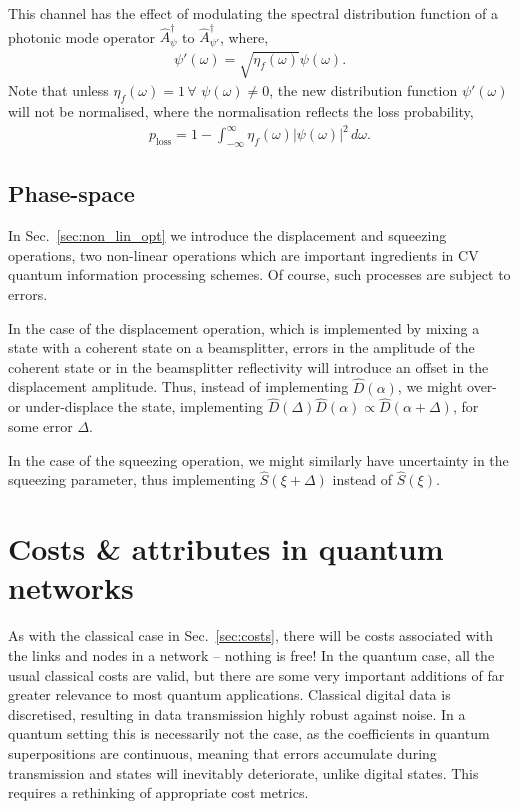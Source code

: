 \documentclass[aps, rmp, twocolumn, amsmath, amssymb, nofootinbib, superscriptaddress, longbibliography, floatfix, table-of-contents, eqsecnum]{revtex4-1}
\begin{document}
This channel has the effect of modulating the spectral distribution function of a photonic mode operator $\hat{A}_\psi^\dag$ to $\hat{A}_{\psi'}^\dag$, where,
\begin{align}
\psi'(\omega) = \sqrt{\eta_f(\omega)}\psi(\omega).	
\end{align}
Note that unless \mbox{$\eta_f(\omega)=1\,\forall\,\,\psi(\omega)\neq 0$}, the new distribution function $\psi'(\omega)$ will not be normalised, where the normalisation reflects the loss probability,
\begin{align}
p_\text{loss} = 1 - \int_{-\infty}^\infty \eta_f(\omega)|\psi(\omega)|^2\,d\omega.
\end{align}

%
%

\subsection{Phase-space} 

In Sec.~\ref{sec:non_lin_opt} we introduce the displacement and squeezing operations, two non-linear operations which are important ingredients in CV quantum information processing schemes. Of course, such processes are subject to errors.

In the case of the displacement operation, which is implemented by mixing a state with a coherent state on a beamsplitter, errors in the amplitude of the coherent state or in the beamsplitter reflectivity will introduce an offset in the displacement amplitude. Thus, instead of implementing $\hat{D}(\alpha)$, we might over- or under-displace the state, implementing \mbox{$\hat{D}(\Delta)\hat{D}(\alpha)\propto \hat{D}(\alpha+\Delta)$}, for some error $\Delta$.

In the case of the squeezing operation, we might similarly have uncertainty in the squeezing parameter, thus implementing $\hat{S}(\xi+\Delta)$ instead of $\hat{S}(\xi)$.

%
%

\section{Costs \& attributes in quantum networks} \label{sec:quantum_meas_cost}
As with the classical case in Sec.~\ref{sec:costs}, there will be costs associated with the links and nodes in a network -- nothing is free! In the quantum case, all the usual classical costs are valid, but there are some very important additions of far greater relevance to most quantum applications. Classical digital data is discretised, resulting in data transmission highly robust against noise. In a quantum setting this is necessarily not the case, as the coefficients in quantum superpositions are continuous, meaning that errors accumulate during transmission and states will inevitably deteriorate, unlike digital states. This requires a rethinking of appropriate cost metrics.
\end{document}
